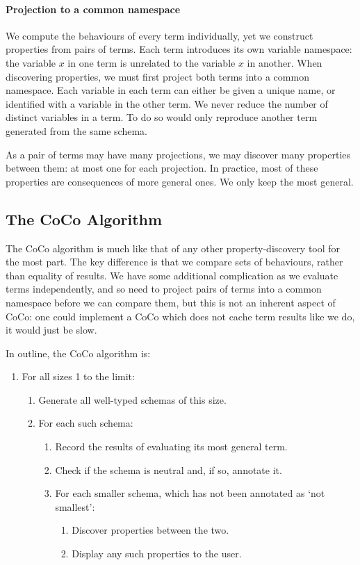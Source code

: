 \paragraph{Projection to a common namespace}
We compute the behaviours of every term individually, yet we construct
properties from pairs of terms.  Each term introduces its own variable
namespace: the variable $x$ in one term is unrelated to the variable
$x$ in another.  When discovering properties, we must first project
both terms into a common namespace.  Each variable in each term can
either be given a unique name, or identified with a variable in the
other term.  We never reduce the number of distinct variables in a
term.  To do so would only reproduce another term generated from the
same schema.

As a pair of terms may have many projections, we may discover many
properties between them: at most one for each projection.  In
practice, most of these properties are consequences of more general
ones.  We only keep the most general.

\subsection{The CoCo Algorithm}
\label{sec:coco-hiw-algo}

The CoCo algorithm is much like that of any other property-discovery
tool for the most part.  The key difference is that we compare sets of
behaviours, rather than equality of results.  We have some additional
complication as we evaluate terms independently, and so need to
project pairs of terms into a common namespace before we can compare
them, but this is not an inherent aspect of CoCo: one could implement
a CoCo which does not cache term results like we do, it would just be
slow.

In outline, the CoCo algorithm is:

\begin{enumerate}
\item For all sizes 1 to the limit:
  \begin{enumerate}
  \item Generate all well-typed schemas of this size.
  \item For each such schema:
    \begin{enumerate}
    \item Record the results of evaluating its most general term.
    \item Check if the schema is neutral and, if so, annotate it.
    \item For each smaller schema, which has not been annotated as
      `not smallest':
      \begin{enumerate}
      \item Discover properties between the two.
      \item Display any such properties to the user.
      \end{enumerate}
    \end{enumerate}
  \end{enumerate}
\end{enumerate}

